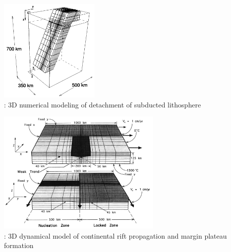 \begin{center}
\begin{minipage}{0.45\textwidth}
\centering
\includegraphics[height=5cm]{images/history/yowo95}\\
{: 3D numerical modeling of detachment of subducted 
lithosphere \cite{yowo95}}
\end{minipage}\hfill
\begin{minipage}{0.45\textwidth}
\centering
\includegraphics[height=6cm]{images/history/dusa96}\\
{: 3D dynamical model of continental rift propagation and 
margin plateau formation \cite{dusa96}}
\end{minipage}
\end{center}







